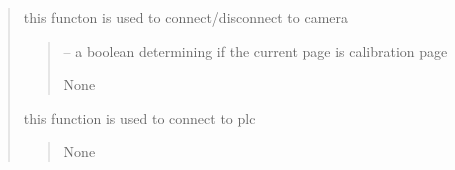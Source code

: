 \documentclass[letterpaper,10pt,english]{sphinxmanual}
\begin{document}
\begin{quote}
\begin{savenotes}
\begin{fulllineitems}
\begin{savenotes}\begin{fulllineitems}
\label{\detokenize{setting/setting_api:oxin.setting_api.API.connect_dissconnect_to_camera}}
\pysigstartsignatures
{}
\pysigstopsignatures
\sphinxAtStartPar
this functon is used to connect/disconnect to camera
\begin{quote}\begin{description}
\sphinxAtStartPar
{} – a boolean determining if the current page is calibration page

\sphinxAtStartPar
None

\end{description}\end{quote}

\end{fulllineitems}\end{savenotes}


\begin{savenotes}\begin{fulllineitems}
\label{\detokenize{setting/setting_api:oxin.setting_api.API.connect_plc}}
\pysigstartsignatures
{}
\pysigstopsignatures
\sphinxAtStartPar
this function is used to connect to plc
\begin{quote}\begin{description}
\sphinxAtStartPar
None

\end{description}\end{quote}

\end{fulllineitems}\end{savenotes}



\end{fulllineitems}
\end{savenotes}
\end{quote}
\end{document}
